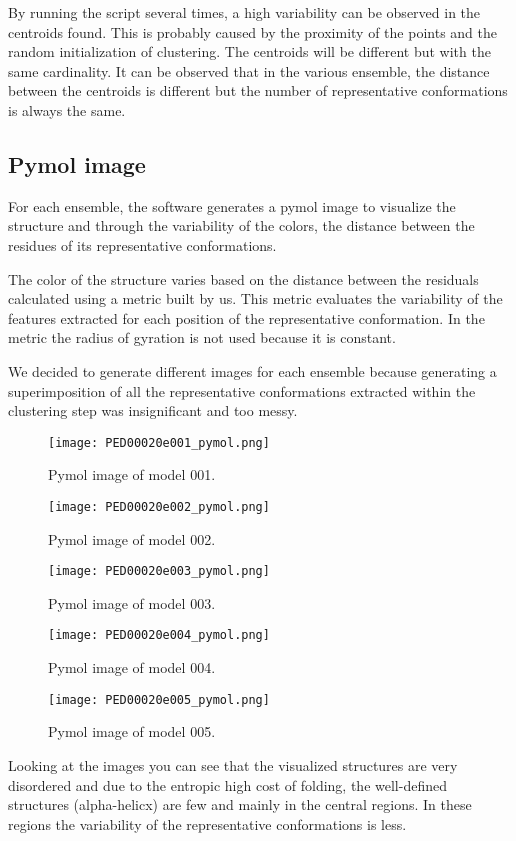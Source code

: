 By running the script several times, a high variability can be observed in the centroids found.
This is probably caused by the proximity of the points and the random initialization of clustering. The centroids will be different but with the same cardinality.
%
It can be observed that in the various ensemble, the distance between the centroids is different but the number of representative conformations is always the same.
%


\subsection{Pymol image}
For each ensemble, the software generates a pymol image to visualize the structure and through the variability of the colors, the distance between the residues of its representative conformations.

The color of the structure varies based on the distance between the residuals calculated using a metric built by us. This metric evaluates the variability of the features extracted for each position of the representative conformation. In the metric the radius of gyration is not used because it is constant.

We decided to generate different images for each ensemble because generating a superimposition of all the representative conformations extracted within the clustering step was insignificant and too messy.

\begin{figure}[H]
	\begin{minipage}[b]{0.9\textwidth}
		\centering
		\texttt{[image: PED00020e001\_pymol.png]}
		\caption{Pymol image of model 001.}
		\label{model001}
	\end{minipage}
	\hfill
	\begin{minipage}[b]{0.47\textwidth}
		\centering
		\texttt{[image: PED00020e002\_pymol.png]}
		\caption{Pymol image of model 002.}
		\label{model002}
	\end{minipage}
	\hfill
	\begin{minipage}[b]{0.47\textwidth}
		\centering
		\texttt{[image: PED00020e003\_pymol.png]}
		\caption{Pymol image of model 003.}
		\label{model003}
	\end{minipage}
	\begin{minipage}[b]{0.47\textwidth}
		\centering
		\texttt{[image: PED00020e004\_pymol.png]}
		\caption{Pymol image of model 004.}
		\label{model004}
	\end{minipage}
	\hfill
	\begin{minipage}[b]{0.47\textwidth}
		\centering
		\texttt{[image: PED00020e005\_pymol.png]}
		\caption{Pymol image of model 005.}
		\label{model005}
	\end{minipage}
\end{figure}

Looking at the images you can see that the visualized structures are very disordered and due to the entropic high cost of folding, the well-defined structures (alpha-helicx) are few and mainly in the central regions. In these regions the variability of the representative conformations is less.
